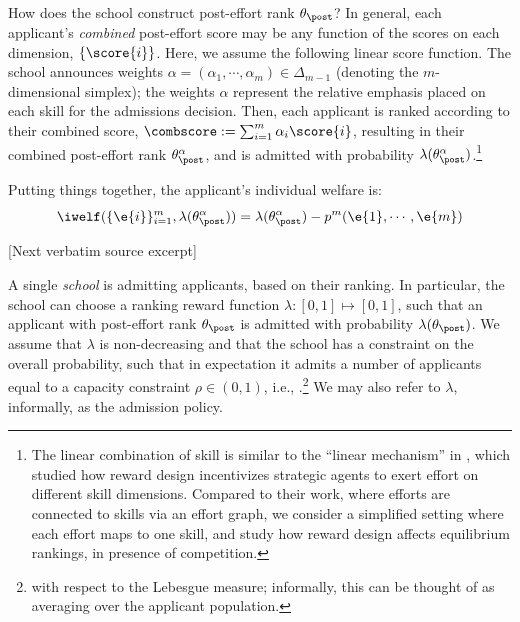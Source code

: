 \documentclass[10pt]{article}
\begin{document}
\begin{ReviewVerbatim}
How does the school construct post-effort rank $\theta_\post$? In general, each applicant's \textit{combined} post-effort score may be any function of the scores on each dimension, $\{\score{i}\}$. Here, we assume the following linear score function. The school announces weights $\alpha = (\alpha_1, \cdots, \alpha_m) \in \Delta_{m-1}$ (denoting the $m$-dimensional simplex); the weights $\alpha$ represent the relative emphasis placed on each skill for the admissions decision. Then, each applicant is ranked according to their combined score, $\combscore := \sum_{i=1}^m \alpha_i\score{i}$, resulting in their combined post-effort rank $\theta_\post^\alpha$, and is admitted with probability $\lambda(\theta_\post^\alpha)$.\footnote{The linear combination of skill is similar to the ``linear mechanism'' in \citet{kleinberg18investeffort}, which studied how reward design incentivizes strategic agents to exert effort on different skill dimensions. Compared to their work, where efforts are connected to skills via an effort graph, we consider a simplified setting where each effort maps to one skill, and study how reward design affects equilibrium rankings, in presence of competition.}


Putting things together, the applicant's individual welfare is:
\begin{equation*}
\iwelf(\{ \e{i} \}_{i=1}^m, \lambda(\theta_\post^\alpha)) = \lambda(\theta_\post^\alpha) - p^m( \e{1}, \cdots, \e{m})
\end{equation*}

[Next verbatim source excerpt]

 A single \textit{school} is admitting applicants, based on their ranking. In particular, the school can choose a ranking reward function $\lambda : [0, 1] \mapsto [0, 1]$, such that an applicant with post-effort rank $\theta_\post$ is admitted with probability $\lambda(\theta_\post)$. We assume that $\lambda$ is non-decreasing and that the school has a constraint on the overall probability, such that in expectation it admits a number of applicants equal to {a} capacity constraint  $\rho \in (0,1)$, i.e., \lledit{$\E_{\theta_\post}[\lambda(\theta_\post)] = \rho $}.\footnote{ with respect to the Lebesgue measure; informally, this can be thought of as averaging over the applicant population.} We may also refer to $\lambda$, informally, as the admission policy.




\end{ReviewVerbatim}
\end{document}
